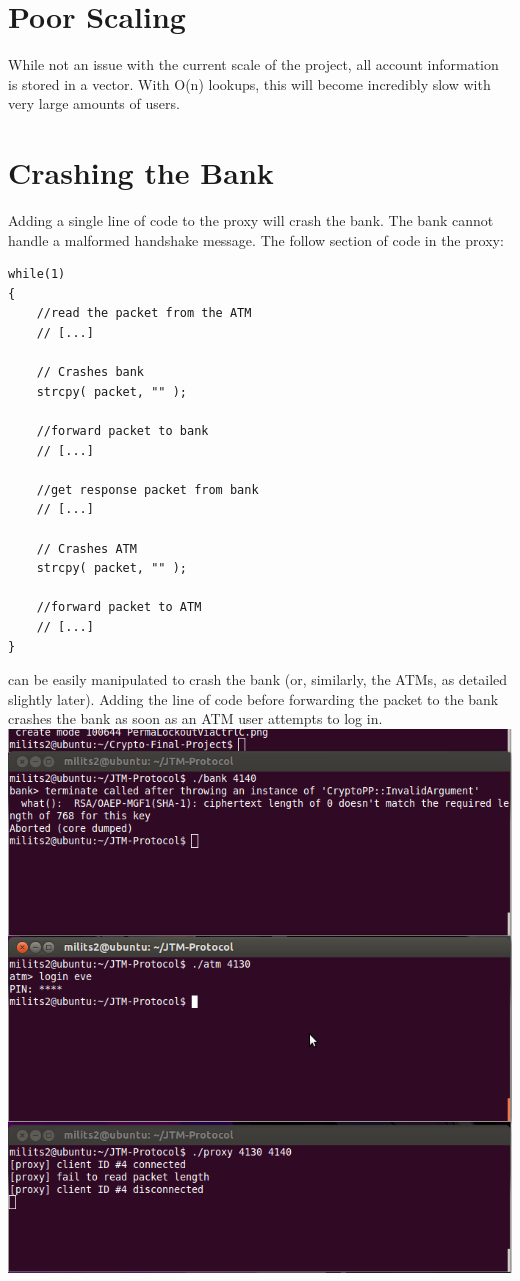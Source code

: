 \documentclass{article}
\begin{document}
\section{Poor Scaling}
While not an issue with the current scale of the project, all account information is stored in a vector. With O(n) lookups, this will become incredibly slow with very large amounts of users.

\section{Crashing the Bank}
Adding a single line of code to the proxy will crash the bank. The bank cannot handle a malformed handshake message. The follow section of code in the proxy:
\begin{lstlisting}
while(1)
{
	//read the packet from the ATM
    // [...]
	
	// Crashes bank
    strcpy( packet, "" );
    
	//forward packet to bank
    // [...]
	
	//get response packet from bank
    // [...]
	
	// Crashes ATM
	strcpy( packet, "" );
	
	//forward packet to ATM
    // [...]
}
\end{lstlisting}
can be easily manipulated to crash the bank (or, similarly, the ATMs, as detailed slightly later). Adding the line of code before forwarding the packet to the bank crashes the bank as soon as an ATM user attempts to log in. 
\\
\includegraphics[scale=0.5]{crashBank.png}
\end{document}
